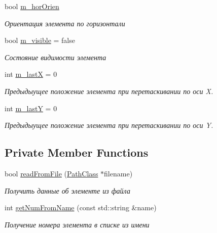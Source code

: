 \begin{DoxyCompactItemize}
bool \hyperlink{class_interface_element_class_a029cdb3ead496730b2aac67d0f22ba34}{m\+\_\+hor\+Orien}
\begin{DoxyCompactList}\small\item\em Ориентация элемента по горизонтали \end{DoxyCompactList}\item 
bool \hyperlink{class_interface_element_class_a734e2f12d7ca918619dda46ac2c4e56e}{m\+\_\+visible} = false
\begin{DoxyCompactList}\small\item\em Состояние видимости элемента \end{DoxyCompactList}\item 
int \hyperlink{class_interface_element_class_aa543f71120067c5cb3f4208a6e0fe3aa}{m\+\_\+lastX} = 0
\begin{DoxyCompactList}\small\item\em Предыдыущее положение элемента при перетаскивании по оси X. \end{DoxyCompactList}\item 
int \hyperlink{class_interface_element_class_abbd9a7e0ff18d4bb41d01aad1653f167}{m\+\_\+lastY} = 0
\begin{DoxyCompactList}\small\item\em Предыдыущее положение элемента при перетаскивании по оси Y. \end{DoxyCompactList}\end{DoxyCompactItemize}
\subsection*{Private Member Functions}
\begin{DoxyCompactItemize}
\item 
bool \hyperlink{class_group_element_class_aaf510a287861dc4096cbe14f0551c8f5}{read\+From\+File} (\hyperlink{class_path_class}{Path\+Class} $\ast$filename)
\begin{DoxyCompactList}\small\item\em Получить данные об элементе из файла \end{DoxyCompactList}\item 
int \hyperlink{class_group_element_class_a6a44164ddddfb4ca3510f46fc393c3fa}{get\+Num\+From\+Name} (const std\+::string \&name)
\begin{DoxyCompactList}\small\item\em Получение номера элемента в списке из имени \end{DoxyCompactList}\end{DoxyCompactItemize}
